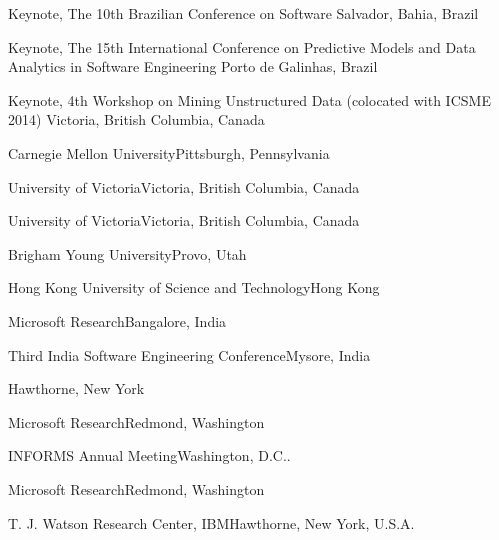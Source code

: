 \documentclass[11pt,letterpaper,roman]{moderncv} %
\begin{document}
	{Keynote, The 10th Brazilian Conference on Software}
	{Salvador, Bahia, Brazil}{}{}

	{Keynote, The 15th International Conference on Predictive Models and Data Analytics in Software Engineering}
	{Porto de Galinhas, Brazil}{}{}

	{Keynote, 4th Workshop on Mining Unstructured Data (colocated with ICSME 2014)}
	{Victoria, British Columbia, Canada}{}{}

{Carnegie Mellon University}{Pittsburgh, Pennsylvania}{}{}
	
{University of Victoria}{Victoria, British Columbia, Canada}{}{}

{University of Victoria}{Victoria, British Columbia, Canada}{}{}

{Brigham Young University}{Provo, Utah}{}{}

{Hong Kong University of Science and Technology}{Hong Kong}{}{}

{Microsoft Research}{Bangalore, India}{}{}

{Third India Software Engineering Conference}{Mysore, India}{}{}

{Hawthorne, New York}{}{}

{Microsoft Research}{Redmond, Washington}{}{}

{INFORMS Annual Meeting}{Washington, D.C..}{}{}

{Microsoft Research}{Redmond, Washington}{}{}

{T. J. Watson Research Center, IBM}{Hawthorne, New York, U.S.A.}{}{}
\end{document}
